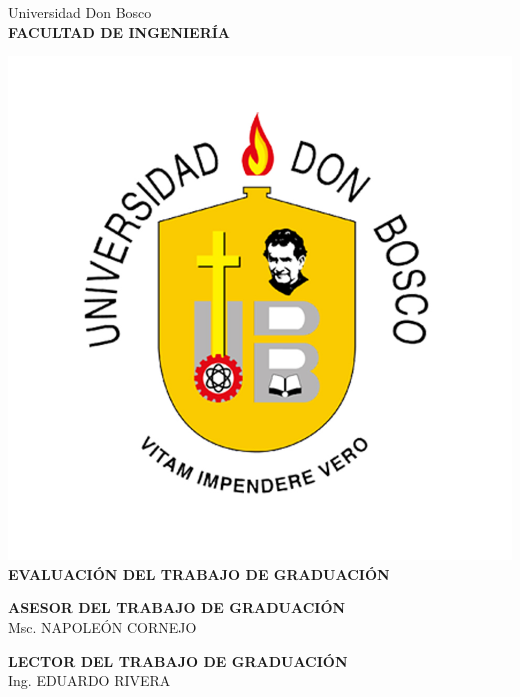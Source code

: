 \begin{titlepage}
    
    \newpage
    \thispagestyle{empty}
    \noindent

        \begin{center}
        \huge{ Universidad Don Bosco }\\
        \vspace*{0.5cm}
        \Large{\textbf{ FACULTAD DE INGENIERÍA }}
    \end{center}

\vspace*{1cm}
\begin{center}
    \includegraphics[scale=0.75]{document/include/Universidad_don_bosco.jpg} \\
    \vspace*{1cm}
    \Large{ \textbf{EVALUACIÓN DEL TRABAJO DE GRADUACIÓN}}
    
\end{center}

    
    \vspace*{2cm}
    \begin{center}
        \Large{\textbf{ASESOR DEL TRABAJO DE GRADUACIÓN}} \\
        Msc. NAPOLEÓN CORNEJO
    \end{center}

    \vspace*{2cm}
    \begin{center}
        \Large{\textbf{LECTOR DEL TRABAJO DE GRADUACIÓN}} \\
        Ing. EDUARDO RIVERA
    \end{center}
    

\end{titlepage}